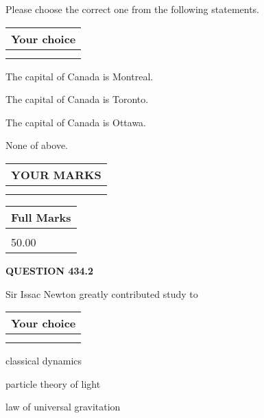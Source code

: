 \documentclass[12pt]{article}
\begin{document}
  
Please choose the correct one from the following statements.
  
  
\noindent\hspace{3.0in} \begin{tabular}{|l|}
\hline
Your choice \\
\hline
 \\ 
 \\ 
\hline
\end{tabular}
  
  
 
 
The capital of Canada is Montreal.
 
 
The capital of Canada is Toronto.
 
 
The capital of Canada is Ottawa.
 
 
 None of above.
 
 
  
\vspace{0.2in}
  
\noindent\begin{tabular}{|l|}
\hline
 YOUR MARKS  \\
\hline
 \\ 
 \\ 
\hline
\end{tabular}
\hspace{0.05in} \begin{tabular}{|l|}
\hline
 Full Marks  \\
\hline
 \\ 
50.00 \\
\hline
\end{tabular}
{\textbf{\Large{QUESTION
434.2 
}}}
  
  
Sir Issac Newton greatly contributed study to
  
  
\noindent\hspace{3.0in} \begin{tabular}{|l|}
\hline
Your choice \\
\hline
 \\ 
 \\ 
\hline
\end{tabular}
  
  
 
 
classical dynamics
 
 
particle theory of light
 
 
law of universal gravitation
 
\end{document}
